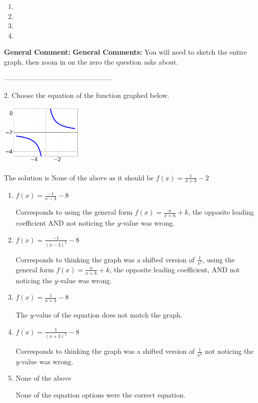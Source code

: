 \documentclass{extbook}[14pt]
\begin{document}
\begin{enumerate}[label=\Alph*.] 
\item   
\item   
\item   
\item   
\end{enumerate} 
 
\textbf{General Comment:} \textbf{General Comments:} You will need to sketch the entire graph, then zoom in on the zero the question asks about. 

-----------------------------------------------

2. Choose the equation of the function graphed below.
\begin{center} \includegraphics[width=0.3\textwidth]{../Figures/rationalGraphToEquationB.png} \end{center} 

The solution is $ \text{None of the above as it should be } f(x) = \frac{1}{x + 3} - 2 $ 

\begin{enumerate}[label=\Alph*.] 
\item $ f(x) = \frac{-1}{x - 3} - 8 $ 

 Corresponds to using the general form $f(x) = \frac{a}{x+h}+k$, the opposite leading coefficient AND not noticing the $y$-value was wrong. 
\item $ f(x) = \frac{-1}{(x - 3)^2} - 8 $ 

 Corresponds to thinking the graph was a shifted version of $\frac{1}{x^2}$, using the general form $f(x) = \frac{a}{x+h}+k$, the opposite leading coefficient, AND not noticing the $y$-value was wrong. 
\item $ f(x) = \frac{1}{x + 3} - 8 $ 

 The $y$-value of the equation does not match the graph. 
\item $ f(x) = \frac{1}{(x + 3)^2} - 8 $ 

 Corresponds to thinking the graph was a shifted version of $\frac{1}{x^2}$ not noticing the $y$-value was wrong. 
\item $ \text{None of the above} $ 

 None of the equation options were the correct equation. 
\end{enumerate} 
 
\end{document}
